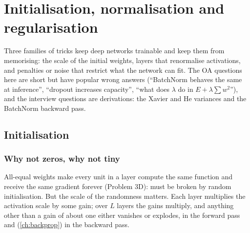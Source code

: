 \chapter{Initialisation, normalisation and regularisation}
\label{ch:reg}

Three families of tricks keep deep networks trainable and keep them from memorising:
the scale of the initial weights, layers that renormalise activations, and penalties or
noise that restrict what the network can fit. The OA questions here are short but have
popular wrong answers (``BatchNorm behaves the same at inference'', ``dropout increases
capacity'', ``what does $\lambda$ do in $E+\lambda\sum w^2$''), and the interview
questions are derivations: the Xavier and He variances and the BatchNorm backward pass.

\section{Initialisation}

\subsection{Why not zeros, why not tiny}
All-equal weights make every unit in a layer compute the same function and receive the
same gradient forever (Problem 3D):  must be broken by random
initialisation. But the scale of the randomness matters. Each layer multiplies the
activation scale by some gain; over $L$ layers the gains multiply, and anything other than
a gain of about one either vanishes or explodes, in the forward pass and (\cref{ch:backprop})
in the backward pass.

